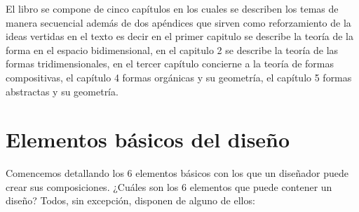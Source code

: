 \documentclass[16pt,]{krantz}
\theoremstyle{definition}
\theoremstyle{definition}
\theoremstyle{definition}
\theoremstyle{definition}
\theoremstyle{remark}
\begin{document}
El libro se compone de cinco capítulos en los cuales se describen los temas de manera secuencial además de dos apéndices que sirven como reforzamiento de la ideas vertidas en el texto es decir en el primer capitulo se describe la teoría de la forma en el espacio bidimensional, en el capitulo 2 se describe la teoría de las formas tridimensionales, en el tercer capítulo concierne a la teoría de formas compositivas, el capítulo 4 formas orgánicas y su geometría, el capítulo 5 formas abstractas y su geometría.

\mainmatter

\hypertarget{elementos-buxe1sicos-del-diseuxf1o}{%
\chapter{Elementos básicos del diseño}\label{elementos-buxe1sicos-del-diseuxf1o}}

Comencemos detallando los 6 elementos básicos con los que un diseñador puede crear sus composiciones. ¿Cuáles son los 6 elementos que puede contener un diseño? Todos, sin excepción, disponen de alguno de ellos:
\end{document}
